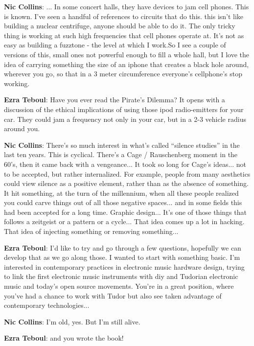 \textbf{Nic Collins}: ... In some concert halls, they have devices to jam cell phones. This is known. I’ve seen a handful of references to circuits that do this. this isn’t like building a nuclear centrifuge, anyone should be able to do it. The only tricky thing is working at such high frequencies that cell phones operate at. It’s not as easy as building a fuzztone - the level at which I work.So I see a couple of versions of this, small ones not powerful enough to fill a whole hall, but I love the idea of carrying something the size of an iphone that creates a black hole around, wherever you go, so that in a 3 meter circumference everyone’s cellphone’s stop working.		
					
\textbf{Ezra Teboul}: Have you ever read the Pirate’s Dilemma? It opens with a discussion of the ethical implications of using those ipod radio-emitters for your car. They could jam a frequency not only in your car, but in a 2-3 vehicle radius around you.
					
\textbf{Nic Collins}: There’s so much interest in what’s called ``silence studies'' in the last ten years. This is cyclical. There’s a Cage / Rauschenberg moment in the 60’s, then it came back with a vengeance... It took so long for Cage’s ideas... not to be accepted, but rather internalized. For example, people from many aesthetics could view silence as a positive element, rather than as the absence of something. It hit something, at the turn of the millennium, when all these people realized you could carve things out of all those negative spaces... and in some fields this had been accepted for a long time. Graphic design... It’s one of those things that follows a zeitgeist or a pattern or a cycle... That idea comes up a lot in hacking. That idea of injecting something or removing something...
					
\textbf{Ezra Teboul}: I’d like to try and go through a few questions, hopefully we can develop that as we go along those. I wanted to start with something basic. I’m interested in contemporary practices in electronic music hardware design, trying to link the first electronic music instruments with diy and Tudorian electronic music and today’s open source movements. You’re in a great position, where you’ve had a chance to work with Tudor but also see taken advantage of contemporary technologies...
					
\textbf{Nic Collins}: I’m old, yes. But I’m still alive.

\textbf{Ezra Teboul}: and you wrote the book!

